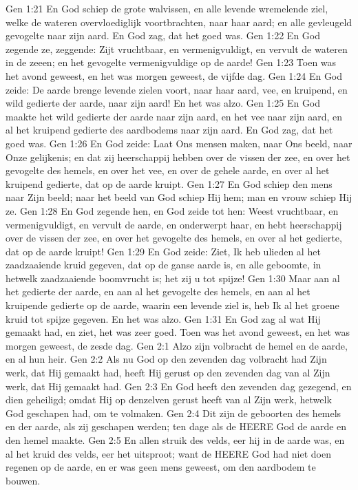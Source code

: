 Gen 1:21  En God schiep de grote walvissen, en alle levende wremelende ziel, welke de wateren overvloediglijk voortbrachten, naar haar aard; en alle gevleugeld gevogelte naar zijn aard. En God zag, dat het goed was.
Gen 1:22  En God zegende ze, zeggende: Zijt vruchtbaar, en vermenigvuldigt, en vervult de wateren in de zeeen; en het gevogelte vermenigvuldige op de aarde!
Gen 1:23  Toen was het avond geweest, en het was morgen geweest, de vijfde dag.
Gen 1:24  En God zeide: De aarde brenge levende zielen voort, naar haar aard, vee, en kruipend, en wild gedierte der aarde, naar zijn aard! En het was alzo.
Gen 1:25  En God maakte het wild gedierte der aarde naar zijn aard, en het vee naar zijn aard, en al het kruipend gedierte des aardbodems naar zijn aard. En God zag, dat het goed was.
Gen 1:26  En God zeide: Laat Ons mensen maken, naar Ons beeld, naar Onze gelijkenis; en dat zij heerschappij hebben over de vissen der zee, en over het gevogelte des hemels, en over het vee, en over de gehele aarde, en over al het kruipend gedierte, dat op de aarde kruipt.
Gen 1:27  En God schiep den mens naar Zijn beeld; naar het beeld van God schiep Hij hem; man en vrouw schiep Hij ze.
Gen 1:28  En God zegende hen, en God zeide tot hen: Weest vruchtbaar, en vermenigvuldigt, en vervult de aarde, en onderwerpt haar, en hebt heerschappij over de vissen der zee, en over het gevogelte des hemels, en over al het gedierte, dat op de aarde kruipt!
Gen 1:29  En God zeide: Ziet, Ik heb ulieden al het zaadzaaiende kruid gegeven, dat op de ganse aarde is, en alle geboomte, in hetwelk zaadzaaiende boomvrucht is; het zij u tot spijze!
Gen 1:30  Maar aan al het gedierte der aarde, en aan al het gevogelte des hemels, en aan al het kruipende gedierte op de aarde, waarin een levende ziel is, heb Ik al het groene kruid tot spijze gegeven. En het was alzo.
Gen 1:31  En God zag al wat Hij gemaakt had, en ziet, het was zeer goed. Toen was het avond geweest, en het was morgen geweest, de zesde dag.
Gen 2:1  Alzo zijn volbracht de hemel en de aarde, en al hun heir.
Gen 2:2  Als nu God op den zevenden dag volbracht had Zijn werk, dat Hij gemaakt had, heeft Hij gerust op den zevenden dag van al Zijn werk, dat Hij gemaakt had.
Gen 2:3  En God heeft den zevenden dag gezegend, en dien geheiligd; omdat Hij op denzelven gerust heeft van al Zijn werk, hetwelk God geschapen had, om te volmaken.
Gen 2:4  Dit zijn de geboorten des hemels en der aarde, als zij geschapen werden; ten dage als de HEERE God de aarde en den hemel maakte.
Gen 2:5  En allen struik des velds, eer hij in de aarde was, en al het kruid des velds, eer het uitsproot; want de HEERE God had niet doen regenen op de aarde, en er was geen mens geweest, om den aardbodem te bouwen.
